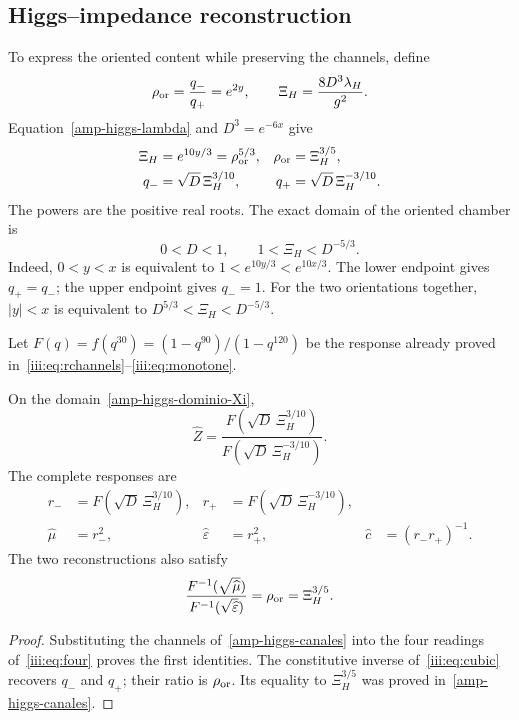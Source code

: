 \subsection{Higgs--impedance reconstruction}

To express the oriented content while preserving the channels, define
\begin{equation}
 \rho_{\rm or}=\frac{q_-}{q_+}=e^{2y},\qquad
 \Xi_H=\frac{8D^3\lambda_H}{g^2}.
 \label{amp-higgs-Xi}
\end{equation}
Equation~\eqref{amp-higgs-lambda} and $D^3=e^{-6x}$ give
\begin{equation}
 \begin{aligned}
 \Xi_H&=e^{10y/3}=\rho_{\rm or}^{5/3},&
 \rho_{\rm or}&=\Xi_H^{3/5},\\
 q_-&=\sqrt D\,\Xi_H^{3/10},&
 q_+&=\sqrt D\,\Xi_H^{-3/10}.
 \end{aligned}
 \label{amp-higgs-canales}
\end{equation}
The powers are the positive real roots. The exact domain of the oriented
chamber is
\begin{equation}
 0<D<1,\qquad 1<\Xi_H<D^{-5/3}.
 \label{amp-higgs-dominio-Xi}
\end{equation}
Indeed, $0<y<x$ is equivalent to $1<e^{10y/3}<e^{10x/3}$.
The lower endpoint gives $q_+=q_-$; the upper endpoint gives $q_-=1$.
For the two orientations together, $|y|<x$ is equivalent to
$D^{5/3}<\Xi_H<D^{-5/3}$.

Let $F(q)=f(q^{30})=(1-q^{90})/(1-q^{120})$ be the response already
proved in~\eqref{iii:eq:rchannels}--\eqref{iii:eq:monotone}.
\begin{corollary}
\label{amp-higgs-impedancia-corolario}
On the domain~\eqref{amp-higgs-dominio-Xi},
\begin{equation}
 \boxed{\widehat Z=
 \frac{F(\sqrt D\,\Xi_H^{3/10})}
 {F(\sqrt D\,\Xi_H^{-3/10})}.}
 \label{amp-higgs-impedancia}
\end{equation}
The complete responses are
\begin{equation}
 \begin{aligned}
 r_-&=F(\sqrt D\,\Xi_H^{3/10}),&
 r_+&=F(\sqrt D\,\Xi_H^{-3/10}),\\
 \widehat\mu&=r_-^2,& \widehat\varepsilon&=r_+^2,&
 \widehat c&=(r_-r_+)^{-1}.
 \end{aligned}
 \label{amp-higgs-vacio}
\end{equation}
The two reconstructions also satisfy
\begin{equation}
 \frac{F^{-1}(\sqrt{\widehat\mu})}
 {F^{-1}(\sqrt{\widehat\varepsilon})}
 =\rho_{\rm or}=\Xi_H^{3/5}.
 \label{amp-higgs-confluencia}
\end{equation}
\end{corollary}
\begin{proof}
Substituting the channels of~\eqref{amp-higgs-canales} into the four
readings of~\eqref{iii:eq:four} proves the first identities. The
constitutive inverse of~\eqref{iii:eq:cubic} recovers $q_-$ and $q_+$;
their ratio is $\rho_{\rm or}$. Its equality to $\Xi_H^{3/5}$ was proved
in~\eqref{amp-higgs-canales}.
\end{proof}

